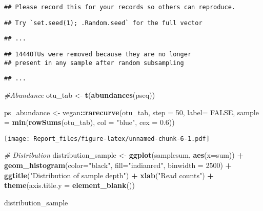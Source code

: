 \documentclass[]{article}
\newenvironment{Shaded}{\begin{snugshade}}{\end{snugshade}}
\newcommand{\CommentTok}[1]{\textcolor[rgb]{0.56,0.35,0.01}{\textit{#1}}}
\newcommand{\DataTypeTok}[1]{\textcolor[rgb]{0.13,0.29,0.53}{#1}}
\newcommand{\DecValTok}[1]{\textcolor[rgb]{0.00,0.00,0.81}{#1}}
\newcommand{\FloatTok}[1]{\textcolor[rgb]{0.00,0.00,0.81}{#1}}
\newcommand{\KeywordTok}[1]{\textcolor[rgb]{0.13,0.29,0.53}{\textbf{#1}}}
\newcommand{\NormalTok}[1]{#1}
\newcommand{\OperatorTok}[1]{\textcolor[rgb]{0.81,0.36,0.00}{\textbf{#1}}}
\newcommand{\OtherTok}[1]{\textcolor[rgb]{0.56,0.35,0.01}{#1}}
\newcommand{\StringTok}[1]{\textcolor[rgb]{0.31,0.60,0.02}{#1}}
\begin{document}
\begin{verbatim}
## Please record this for your records so others can reproduce.
\end{verbatim}

\begin{verbatim}
## Try `set.seed(1); .Random.seed` for the full vector
\end{verbatim}

\begin{verbatim}
## ...
\end{verbatim}

\begin{verbatim}
## 1444OTUs were removed because they are no longer 
## present in any sample after random subsampling
\end{verbatim}

\begin{verbatim}
## ...
\end{verbatim}

\begin{Shaded}
\begin{Highlighting}[]
\CommentTok{#Abundance}
\NormalTok{otu_tab <-}\StringTok{ }\KeywordTok{t}\NormalTok{(}\KeywordTok{abundances}\NormalTok{(pseq)) }

\NormalTok{ps_abundance <-}\StringTok{ }\NormalTok{vegan}\OperatorTok{::}\KeywordTok{rarecurve}\NormalTok{(otu_tab, }\DataTypeTok{step =} \DecValTok{50}\NormalTok{, }\DataTypeTok{label=} \OtherTok{FALSE}\NormalTok{, }\DataTypeTok{sample =} \KeywordTok{min}\NormalTok{(}\KeywordTok{rowSums}\NormalTok{(otu_tab), }\DataTypeTok{col =} \StringTok{"blue"}\NormalTok{, }\DataTypeTok{cex =} \FloatTok{0.6}\NormalTok{))}
\end{Highlighting}
\end{Shaded}

\texttt{[image: Report\_files/figure-latex/unnamed-chunk-6-1.pdf]}

\begin{Shaded}
\begin{Highlighting}[]
\CommentTok{# Distribution}
\NormalTok{distribution_sample <-}\StringTok{ }\KeywordTok{ggplot}\NormalTok{(samplesum, }\KeywordTok{aes}\NormalTok{(}\DataTypeTok{x=}\NormalTok{sum)) }\OperatorTok{+}\StringTok{ }\KeywordTok{geom_histogram}\NormalTok{(}\DataTypeTok{color=}\StringTok{"black"}\NormalTok{, }\DataTypeTok{fill=}\StringTok{"indianred"}\NormalTok{, }\DataTypeTok{binwidth =} \DecValTok{2500}\NormalTok{) }\OperatorTok{+}
\KeywordTok{ggtitle}\NormalTok{(}\StringTok{"Distribution of sample depth"}\NormalTok{) }\OperatorTok{+}\StringTok{ }\KeywordTok{xlab}\NormalTok{(}\StringTok{"Read counts"}\NormalTok{) }\OperatorTok{+}\StringTok{ }\KeywordTok{theme}\NormalTok{(}\DataTypeTok{axis.title.y =} \KeywordTok{element_blank}\NormalTok{())}

\NormalTok{distribution_sample}
\end{Highlighting}
\end{Shaded}
\end{document}
